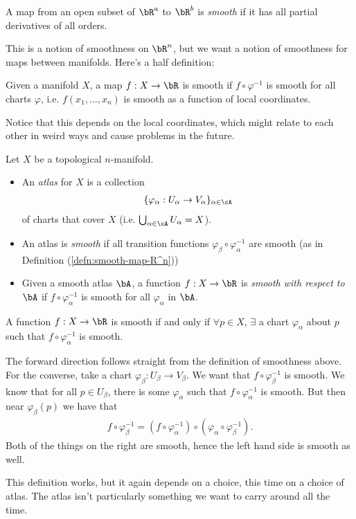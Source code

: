 \begin{defn}\label{defn:smooth-map-R^n}
	A map from an open subset of $\bR^a$ to $\bR^b$ is \emph{smooth} if it has all partial derivatives of all orders.
\end{defn}

This is a notion of smoothness on $\bR^n$, but we want a notion of smoothness for maps between manifolds. Here's a half definition:
\begin{predefn}
	Given a manifold $X$, a map $f:X\to \bR$ is smooth if $f\circ \varphi^{-1}$ is smooth for all charts $\varphi$, i.e. $f(x_1,...,x_n)$ is smooth as a function of local coordinates.
\end{predefn}
Notice that this depends on the local coordinates, which might relate to each other in weird ways and cause problems in the future.
\begin{defn}\label{defn:atlas}
	Let $X$ be a topological $n$-manifold.
    \begin{itemize}
		\item An \emph{atlas} for $X$ is a collection
	    \begin{align*}
		    \{\varphi_\alpha:U_\alpha\to V_\alpha\}_{\alpha\in \cA}
	    \end{align*}
	    of charts that cover $X$ (i.e. $\bigcup_{\alpha \in \cA} U_\alpha = X$).\
        \item An atlas is \emph{smooth} if all transition functions $\varphi_\beta\circ\varphi^{-1}_\alpha$ are smooth (as in Definition (\ref{defn:smooth-map-R^n}))
		\item Given a smooth atlas $\bA$, a function $f:X\to \bR$ is \emph{smooth with respect to $\bA$} if $f \circ \varphi^{-1}_\alpha$ is smooth for all $\varphi_\alpha$ in $\bA$.
    \end{itemize}
\end{defn}
\begin{lem}\label{lem:basic-smooth-chart-lemma}
	A function $f:X\to \bR$ is smooth if and only if $\forall p\in X$, $\exists$ a chart $\varphi_\alpha$ about $p$ such that $f \circ \varphi_\alpha^{-1}$ is smooth.
\end{lem}
\begin{prf}
	The forward direction follows straight from the definition of smoothness above. For the converse, take a chart $\varphi_\beta:U_\beta\to V_\beta$. We want that $f\circ \varphi_\beta^{-1}$ is smooth. We know that for all $p \in U_\beta$, there is some $\varphi_\alpha$ such that $f\circ \varphi_\alpha^{-1}$ is smooth. But then near $\varphi_\beta(p)$ we have that
	\begin{align*}
		f\circ \varphi_\beta^{-1} = (f\circ \varphi_\alpha^{-1})\circ (\varphi_\alpha\circ\varphi_\beta^{-1}).
	\end{align*}
	Both of the things on the right are smooth, hence the left hand side is smooth as well.
\end{prf}
This definition works, but it again depends on a choice, this time on a choice of atlas. The atlas isn't particularly something we want to carry around all the time.

